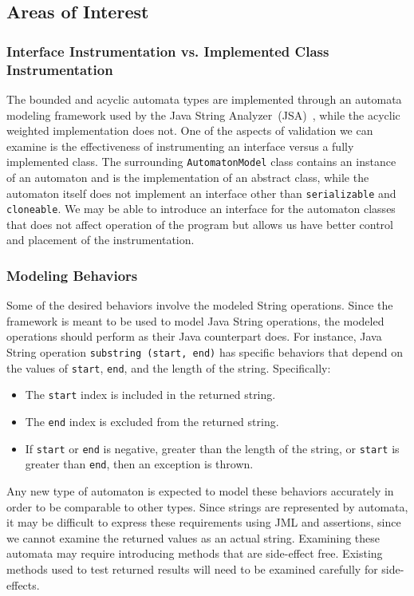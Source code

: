 \documentclass[letterpaper,11pt,twocolumn]{article}
\begin{document}
\subsection{Areas of Interest}

\subsubsection{Interface Instrumentation vs. Implemented Class Instrumentation}

The bounded and acyclic automata types are implemented through an automata
modeling framework used by the Java String Analyzer~(JSA)~\cite{strings2003},
while the acyclic weighted implementation does not.  One of the aspects of
validation we can examine is the effectiveness of instrumenting an interface
versus a fully implemented class.  The surrounding \texttt{AutomatonModel}
class contains an instance of an automaton and is the implementation of an
abstract class, while the automaton itself does not implement an interface
other than \texttt{serializable} and \texttt{cloneable}.  We may be able to
introduce an interface for the automaton classes that does not affect operation
of the program but allows us have better control and placement of the
instrumentation.

\subsubsection{Modeling Behaviors}

Some of the desired behaviors involve the modeled String operations. Since the
framework is meant to be used to model Java String operations, the modeled
operations should perform as their Java counterpart does.  For instance, Java
String operation \texttt{substring~(start, end)} has specific behaviors that
depend on the values of \texttt{start}, \texttt{end}, and the length of the
string.  Specifically:

\begin{itemize}
\item{The \texttt{start} index is included in the returned string.}
\item{The \texttt{end} index is excluded from the returned string.}
\item{If \texttt{start} or \texttt{end} is negative, greater than the length of
    the string, or \texttt{start} is greater than \texttt{end}, then an
    exception is thrown.}
\end{itemize}

Any new type of automaton is expected to model these behaviors accurately in
order to be comparable to other types.  Since strings are represented by
automata, it may be difficult to express these requirements using JML and
assertions, since we cannot examine the returned values as an actual string.
Examining these automata may require introducing methods that are side-effect
free.  Existing methods used to test returned results will need to be examined
carefully for side-effects.
\end{document}
